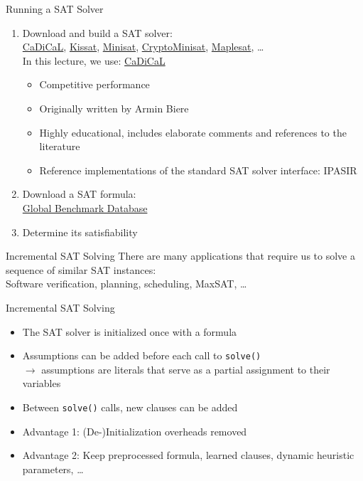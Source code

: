 \documentclass[t]{sdqbeamer}
\begin{document}
\begin{frame}{Running a SAT Solver}
\\[1em]
\begin{enumerate}\setlength{\itemsep}{1em}
	\item Download and build a SAT solver:\\[1ex]
	\href{https://github.com/arminbiere/cadical}{CaDiCaL}, \href{https://github.com/arminbiere/kissat}{Kissat}, \href{https://github.com/niklasso/minisat}{Minisat}, \href{https://github.com/msoos/cryptominisat}{CryptoMinisat}, \href{https://maplesat.github.io/}{Maplesat}, \dots\\[1ex]
	In this lecture, we use: \href{https://github.com/arminbiere/cadical}{CaDiCaL}\\[1ex]
	\begin{itemize}\setlength{\itemsep}{1ex}
		\item Competitive performance
		\item Originally written by Armin Biere
		\item Highly educational, includes elaborate comments and references to the literature
		\item Reference implementations of the standard SAT solver interface: IPASIR
	\end{itemize}
	\item Download a SAT formula:\\[1ex]
	\href{https://benchmark-database.de}{Global Benchmark Database}
	\item Determine its satisfiability
\end{enumerate}
\end{frame}

\begin{frame}{Incremental SAT Solving}
There are many applications that require us to solve a sequence of similar SAT instances:\\[1ex] 
Software verification, planning, scheduling, MaxSAT, \dots\\[1em]
\begin{block}{Incremental SAT Solving}
\begin{itemize}\setlength{\itemsep}{1em}
	\item The SAT solver is initialized once with a formula
	\item Assumptions can be added before each call to \texttt{solve()}\\[1ex]
	$\rightarrow$ assumptions are literals that serve as a partial assignment to their variables
	\item Between \texttt{solve()} calls, new clauses can be added
	\item Advantage 1: (De-)Initialization overheads removed
	\item Advantage 2: Keep preprocessed formula, learned clauses, dynamic heuristic parameters, \ldots
\end{itemize}
\end{block}
\end{frame}
\end{document}
